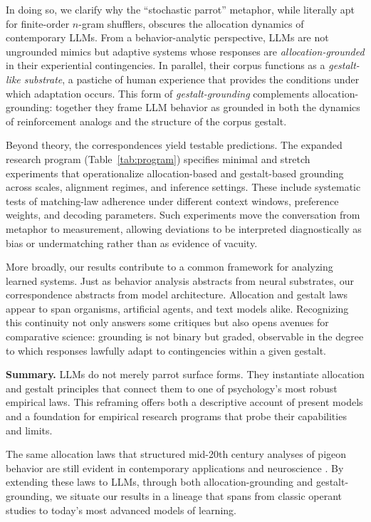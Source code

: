 \documentclass[11pt]{article}
\begin{document}
In doing so, we clarify why the ``stochastic parrot'' metaphor, while literally
apt for finite-order $n$-gram shufflers, obscures the allocation dynamics of
contemporary LLMs. From a behavior-analytic perspective, LLMs are not ungrounded
mimics but adaptive systems whose responses are \emph{allocation-grounded} in
their experiential contingencies. In parallel, their corpus functions as a
\emph{gestalt-like substrate}, a pastiche of human experience that provides the
conditions under which adaptation occurs. This form of \emph{gestalt-grounding}
complements allocation-grounding: together they frame LLM behavior as grounded
in both the dynamics of reinforcement analogs and the structure of the corpus
gestalt.

Beyond theory, the correspondences yield testable predictions. The expanded
research program (Table~\ref{tab:program}) specifies minimal and stretch
experiments that operationalize allocation-based and gestalt-based grounding
across scales, alignment regimes, and inference settings. These include
systematic tests of matching-law adherence under different context windows,
preference weights, and decoding parameters. Such experiments move the
conversation from metaphor to measurement, allowing deviations to be interpreted
diagnostically as bias or undermatching rather than as evidence of vacuity.

More broadly, our results contribute to a common framework for analyzing learned
systems. Just as behavior analysis abstracts from neural substrates, our
correspondence abstracts from model architecture. Allocation and gestalt laws
appear to span organisms, artificial agents, and text models alike. Recognizing
this continuity not only answers some critiques but also opens avenues for
comparative science: grounding is not binary but graded, observable in the
degree to which responses lawfully adapt to contingencies within a given
gestalt.

\textbf{Summary.} LLMs do not merely parrot surface forms. They instantiate
allocation and gestalt principles that connect them to one of psychology’s most
robust empirical laws. This reframing offers both a descriptive account of
present models and a foundation for empirical research programs that probe their
capabilities and limits.

The same allocation laws that structured mid-20th century analyses of pigeon
behavior \citep{herrnstein1961matching,baum1974generalized} are still evident in
contemporary applications and neuroscience
\citep{kronfli2021matching,rajagopalan2023reward,anderson2024texting,mastermind2025matching}.
By extending these laws to LLMs, through both allocation-grounding and
gestalt-grounding, we situate our results in a lineage that spans from classic
operant studies to today’s most advanced models of learning.
\end{document}
